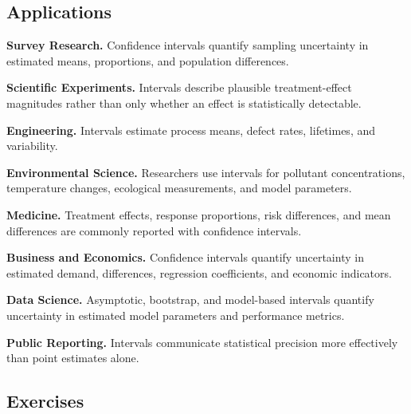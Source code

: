 \subsection{Applications}
\label{subsec:confidence-interval-applications}

\begin{applicationbox}

\textbf{Survey Research.}
Confidence intervals quantify sampling uncertainty in estimated means,
proportions, and population differences.

\medskip

\textbf{Scientific Experiments.}
Intervals describe plausible treatment-effect magnitudes rather than
only whether an effect is statistically detectable.

\medskip

\textbf{Engineering.}
Intervals estimate process means, defect rates, lifetimes, and
variability.

\medskip

\textbf{Environmental Science.}
Researchers use intervals for pollutant concentrations, temperature
changes, ecological measurements, and model parameters.

\medskip

\textbf{Medicine.}
Treatment effects, response proportions, risk differences, and mean
differences are commonly reported with confidence intervals.

\medskip

\textbf{Business and Economics.}
Confidence intervals quantify uncertainty in estimated demand,
differences, regression coefficients, and economic indicators.

\medskip

\textbf{Data Science.}
Asymptotic, bootstrap, and model-based intervals quantify uncertainty in
estimated model parameters and performance metrics.

\medskip

\textbf{Public Reporting.}
Intervals communicate statistical precision more effectively than point
estimates alone.

\end{applicationbox}

\subsection{Exercises}
\label{subsec:confidence-interval-exercises}

